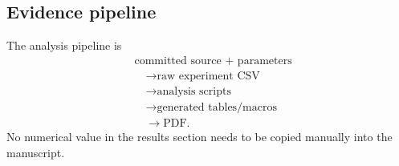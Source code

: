 \subsection{Evidence pipeline}

The analysis pipeline is
\[
\begin{aligned}
  &\text{committed source + parameters}\\
  &\quad\longrightarrow\text{raw experiment CSV}\\
  &\quad\longrightarrow\text{analysis scripts}\\
  &\quad\longrightarrow\text{generated tables/macros}\\
  &\quad\longrightarrow\text{PDF}.
\end{aligned}
\]
No numerical value in the results section needs to be copied manually into the
manuscript.

